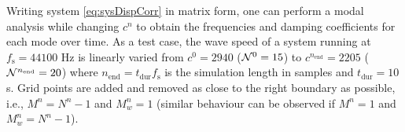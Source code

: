 Writing system \eqref{eq:sysDispCorr} in matrix form, one can perform a modal analysis while changing $c^n$ to obtain the frequencies and damping coefficients for each mode over time. As a test case, the wave speed of a system running at $f_\text{s} = 44100$ Hz is linearly varied from $c^0 = 2940$ ($\mathcal{N}^0 = 15$) to $c^{n_\text{end}} = 2205$ ($\mathcal{N}^{n_\text{end}} = 20$) where $n_\text{end} = t_\text{dur} f_\text{s}$ is the simulation length in samples and $t_\text{dur} = 10$ s. Grid points are added and removed as close to the right boundary as possible, i.e., $M^n = N^n-1$ and $M_w^n = 1$ (similar behaviour can be observed if $M^n = 1$ and $M_w^n = N^n-1$).  %
